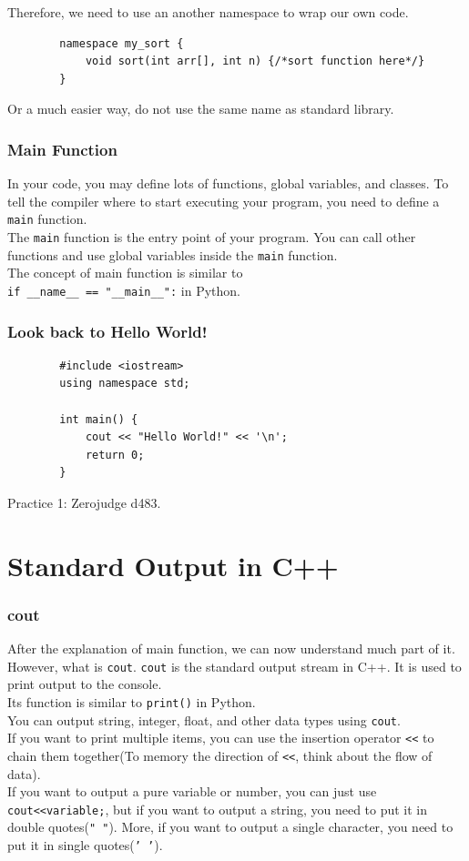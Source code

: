 \documentclass[xcolor=dvipsnames]{beamer}
\begin{document}
    \begin{frame}[fragile]
        Therefore, we need to use an another namespace to wrap our own code.
        \begin{verbatim}
        namespace my_sort {
            void sort(int arr[], int n) {/*sort function here*/}
        }
        \end{verbatim}
        Or a much easier way, do not use the same name as standard library.
    \end{frame}

    \begin{frame}
        \frametitle{Main Function}
        In your code, you may define lots of functions, global variables, and classes. To tell the compiler where to start executing your program, you need to define a \texttt{main} function.\\
        The \texttt{main} function is the entry point of your program. You can call other functions and use global variables inside the \texttt{main} function.\\
        The concept of main function is similar to\\ \texttt{if \_\_name\_\_ == "\_\_main\_\_":} in Python.
    \end{frame}

    \begin{frame}[fragile]
        \frametitle{Look back to Hello World!}
        \begin{verbatim}
        #include <iostream>
        using namespace std;

        int main() {
            cout << "Hello World!" << '\n';
            return 0;
        }
        \end{verbatim}
        Practice 1: Zerojudge d483.
    \end{frame}

    \section{Standard Output in C++}
    \begin{frame}
        \frametitle{cout}
        After the explanation of main function, we can now understand much part of it. However, what is \texttt{cout}.
        \texttt{cout} is the standard output stream in C++. It is used to print output to the console.\\Its function is similar to \texttt{print()} in Python.\\
        You can output string, integer, float, and other data types using \texttt{cout}.\\
        If you want to print multiple items, you can use the insertion operator \texttt{<<} to chain them together(To memory the direction of \texttt{<<}, think about the flow of data).\\
        If you want to output a pure variable or number, you can just use \texttt{cout<<variable;}, but if you want to output a string, you need to put it in double quotes(\texttt{" "}). More, if you want to output a single character, you need to put it in single quotes(\texttt{' '}).
    \end{frame}
\end{document}
